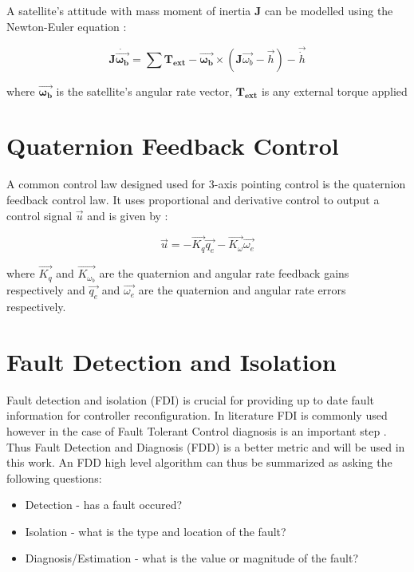 A satellite's attitude with mass moment of inertia $\boldsymbol{J}$ can be modelled using the Newton-Euler equation \cite{sidiAttitudeDynamicsKinematics1997}: 

$$
\mathbf{J}\mathbf{\dot{\vec{\omega_{b}}}} = \sum{\mathbf{T_{ext}}} -\mathbf{\vec{\omega_{b}}}\times(\mathbf{J}\vec{\omega_{b}}-\vec{h})-\vec{\dot{h}}
$$

where $\boldsymbol{\vec{\omega_{b}}}$ is the satellite's angular rate vector, $\boldsymbol{T_{ext}}$ is any external torque applied

\section{Quaternion Feedback Control}
A common control law designed used for 3-axis pointing control is the quaternion feedback control law.
It uses proportional and derivative control to output a control signal $\vec{u}$ and is given by \cite{wieSpaceVehicleDynamics1998}:

\begin{equation}
    \vec{u} = -\vec{K_{q}}\vec{q_{e}} - \vec{K_{\omega}}\vec{\omega_{e}}
\end{equation}

where $\vec{K_{q}}$ and $\vec{K_{\omega_{b}}}$ are the quaternion and angular rate feedback gains respectively and $\vec{q_{e}}$ and $\vec{\omega_{e}}$ 
are the quaternion and angular rate errors respectively.

\section{Fault Detection and Isolation}
Fault detection and isolation (FDI) is crucial for providing up to date fault information for controller reconfiguration. 
In literature FDI is commonly used however in the case of Fault Tolerant Control diagnosis is an important step \cite{yinReviewRecentDevelopment2016}. 
Thus Fault Detection and Diagnosis (FDD) is a better metric and will be used in this work. 
An FDD high level algorithm can thus be summarized as asking the following questions:
\begin{itemize}
    \item Detection - has a fault occured?
    \item Isolation - what is the type and location of the fault?
    \item Diagnosis/Estimation - what is the value or magnitude of the fault?
\end{itemize}

